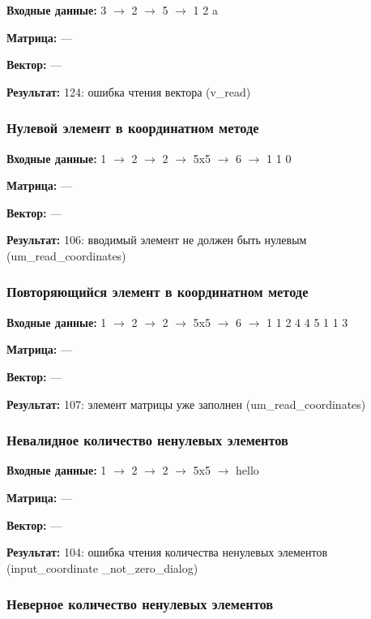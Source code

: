 \documentclass[a4paper,12pt]{extarticle}
\begin{document}
\textbf{Входные данные: }
3 $\rightarrow$ 2 $\rightarrow$ 5 $\rightarrow$ 1 2 a

\textbf{Матрица: }
---

\textbf{Вектор: }
---

\textbf{Результат: }
124: ошибка чтения вектора (v\_read)

\subsubsection{Нулевой элемент в координатном методе}



\textbf{Входные данные: }
1 $\rightarrow$ 2 $\rightarrow$ 2 $\rightarrow$ 5x5 $\rightarrow$ 6 $\rightarrow$ 1 1 0

\textbf{Матрица: }
---

\textbf{Вектор: }
---

\textbf{Результат: }
106: вводимый элемент не должен быть нулевым (um\_read\_coordinates)

\subsubsection{Повторяющийся элемент в координатном методе}



\textbf{Входные данные: }
1 $\rightarrow$ 2 $\rightarrow$ 2 $\rightarrow$ 5x5 $\rightarrow$ 6 $\rightarrow$ 1 1 2 4 4 5 1 1 3

\textbf{Матрица: }
---

\textbf{Вектор: }
---

\textbf{Результат: }
107: элемент матрицы уже заполнен (um\_read\_coordinates)

\subsubsection{Невалидное количество ненулевых элементов}



\textbf{Входные данные: }
1 $\rightarrow$ 2 $\rightarrow$ 2 $\rightarrow$ 5x5 $\rightarrow$ hello

\textbf{Матрица: }
---

\textbf{Вектор: }
---

\textbf{Результат: }
104: ошибка чтения количества ненулевых элементов (input\_coordinate \_not\_zero\_dialog)

\subsubsection{Неверное количество ненулевых элементов}
\end{document}

